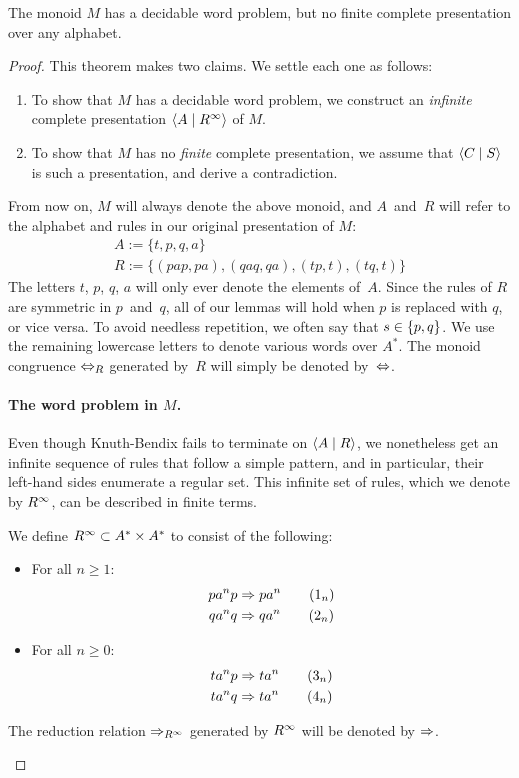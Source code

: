 \documentclass[../generics]{subfiles}
\begin{document}
\begin{theorem}\label{thm:monoid m is not fcrs}
The monoid $M$ has a decidable word problem, but no finite complete presentation over any alphabet.
\end{theorem}
\begin{proof}
This theorem makes two claims. We settle each one as follows:
\begin{enumerate}
\item To show that $M$ has a decidable word problem, we construct an \emph{infinite} complete presentation $\langle A \mid R^\infty\rangle$ of $M$.
\item To show that $M$ has no \emph{finite} complete presentation, we assume that $\langle C \mid S\rangle$ is such a presentation, and derive a contradiction.
\end{enumerate}

From now on, $M$ will always denote the above monoid, and $A$~and~$R$ will refer to the alphabet and rules in our original presentation of $M$:
\begin{gather*}
A := \{ t, p, q, a \}\\
R := \{ (pap, pa), (qaq, qa), (tp, t), (tq, t) \}
\end{gather*}
The letters $t$, $p$, $q$, $a$ will only ever denote the elements of~$A$. Since the rules of $R$ are symmetric in $p$~and~$q$, all of our lemmas will hold when $p$ is replaced with $q$, or vice versa. To avoid needless repetition, we often say that $s \in \{p,q\}$. We use the remaining lowercase letters to denote various words over $A^*$. The monoid congruence $\Leftrightarrow_R$ generated by~$R$ will simply be denoted by~$\Leftrightarrow$.

\paragraph{The word problem in $M$.}
Even though Knuth-Bendix fails to terminate on $\langle A \mid R\rangle$, we nonetheless get an infinite sequence of rules that follow a simple pattern, and in particular, their left-hand sides enumerate a regular set. This infinite set of rules, which we denote by $R^\infty$, can be described in finite terms.

\begin{definition}\label{def:tpqa infinite complete}
We define $R^\infty \subset A^* \times A^*$ to consist of the following:
\begin{itemize}
\item For all $n \geq 1$:
\begin{gather*}
pa^np \Rightarrow pa^n \tag{$1_n$} \\
qa^nq \Rightarrow qa^n \tag{$2_n$}
\end{gather*}
\item For all $n \geq 0$:
\begin{gather*}
ta^np \Rightarrow ta^n \tag{$3_n$} \\
ta^nq \Rightarrow ta^n \tag{$4_n$}
\end{gather*}
\end{itemize}
The reduction relation $\Rightarrow_{R^\infty}$ generated by $R^\infty$ will be denoted by $\Rightarrow$.
\end{definition}


\end{proof}
\end{document}
